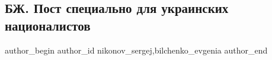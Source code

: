 
 
 
 
 
 
\subsection{БЖ. Пост специально для украинских националистов}
\label{sec:19_09_2021.fb.nikonov_sergej.1.bilchenko_dlja_nacionalistov}
 
\ifcmt
 author_begin
   author_id nikonov_sergej,bilchenko_evgenia
 author_end
\fi
